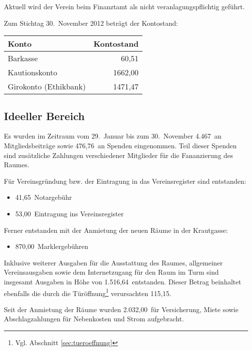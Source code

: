 \documentclass[10pt,DIV16]{scrartcl}
\begin{document}
Aktuell wird der Verein beim Finanztamt als nicht veranlagungspflichtig
geführt.

Zum Stichtag 30.~November 2012 beträgt der Kontostand:

\begin{table}[h!]
	\centering
	\begin{tabular}{l|r}
		\textbf{Konto} & \textbf{Kontostand}  \\ \hline
		Barkasse & 60,51\EUR\\
		Kautionskonto & 1662,00\EUR\\
		Girokonto (Ethikbank) & 1471,47\EUR\\
	\end{tabular}
\end{table}

\subsection{Ideeller Bereich}

Es wurden im Zeitraum vom 29.~Januar bis zum 30.~November 4.467\EUR\
an Mitgliedsbeiträge sowie 476,76\EUR\ an Spenden eingenommen. Teil
dieser Spenden sind zusätzliche Zahlungen verschiedener Mitglieder
für die Fananzierung des Raumes.

Für Vereinsgründung bzw. der Eintragung in das Vereinsregister sind
entstanden:

\begin{itemize}
	\item 41,65\EUR\ Notargebühr
	\item 53,00\EUR\ Eintragung ins Vereinsregister
\end{itemize}

\noindent{} Ferner entstanden mit der Anmietung der neuen Räume in
der Krautgasse:

\begin{itemize}
	\item 870,00\EUR\ Marklergebühren
\end{itemize}

Inklusive weiterer Ausgaben für die Ausstattung des Raumes,
allgemeiner Vereinsausgaben sowie dem Internetzugang für den Raum im
Turm sind insgesamt Ausgaben in Höhe von 1.516,64\EUR\ entstanden.
Dieser Betrag beinhaltet ebenfalls die durch die Türöffnung\footnote
{Vgl. Abschnitt \ref{sec:tueroeffnung}} verursachten 115,15\EUR.

Seit der Anmietung der Räume wurden 2.032,00\EUR\ für Versicherung,
Miete sowie Abschlagzahlungen für Nebenkosten und Strom aufgebracht.
\end{document}
